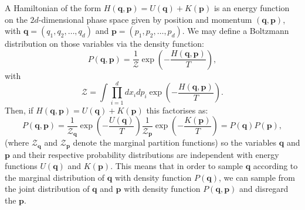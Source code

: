 \documentclass[12pt]{article}
\begin{document}
            A Hamiltonian of the form $H\left(\bm{q},\bm{p}\right)=U\left(\bm{q}\right)+K\left(\bm{p}\right)$ is an energy function on the $2d$-dimensional phase space given by position and momentum $\left(\bm{q},\bm{p}\right)$, with $\bm{q} = \left(q_{1},q_{2},\dots,q_{d}\right)$ and $\bm{p} = \left(p_{1},p_{2},\dots,p_{d}\right)$. We may define a Boltzmann distribution on those variables via the density function:
            \begin{equation}
                \label{eq:BoltzmannDistributionXP}
                P\left(\bm{q},\bm{p}\right) = \frac{1}{\mathcal{Z}}\exp{\left(-\frac{H\left(\bm{q},\bm{p}\right)}{T} \right)},
            \end{equation}
            with 
            \begin{equation}
                \mathcal{Z} = \int\prod_{i=1}^{d}dx_{i}dp_{i} \exp{\left(-\frac{H\left(\bm{q},\bm{p}\right)}{T}\right)}.
            \end{equation}
            Then, if $H\left(\bm{q},\bm{p}\right) = U\left(\bm{q}\right) + K\left(\bm{p}\right)$ this factorises as:
            \begin{equation}
                \label{eq:BoltzmannDistributionXPFactorised}
                P\left(\bm{q},\bm{p}\right) = \frac{1}{\mathcal{Z}_{\bm{q}}}\exp{\left(-\frac{U\left(\bm{q}\right)}{T} \right)}\frac{1}{\mathcal{Z}_{\bm{p}}}\exp{\left(-\frac{K\left(\bm{p}\right)}{T} \right)} = P\left(\bm{q}\right) P\left(\bm{p}\right),
            \end{equation}
            (where $\mathcal{Z}_{\bm{q}}$ and $\mathcal{Z}_{\bm{p}}$ denote the marginal partition functions) so the variables $\bm{q}$ and $\bm{p}$ and their respective probability distributions are independent with energy functions $U\left(\bm{q}\right)$ and $K\left(\bm{p}\right)$. This means that in order to sample $\bm{q}$ according to the marginal distribution of $\bm{q}$ with density function $P\left(\bm{q}\right)$, we can sample from the joint distribution of $\bm{q}$ and $\bm{p}$ with density function $P\left(\bm{q},\bm{p}\right)$ and disregard the $\bm{p}$. 
\end{document}
